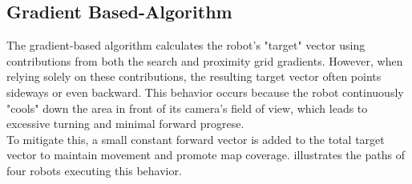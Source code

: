 \subsection{Gradient Based-Algorithm}
The gradient-based algorithm calculates the robot's "target" vector using contributions from both the search and proximity grid gradients. However, when relying solely on these contributions, the resulting target vector often points sideways or even backward. This behavior occurs because the robot continuously "cools" down the area in front of its camera's field of view, which leads to excessive turning and minimal forward progrese. \\

To mitigate this, a small constant forward vector is added to the total target vector to maintain movement and promote map coverage.  illustrates the paths of four robots executing this behavior.

